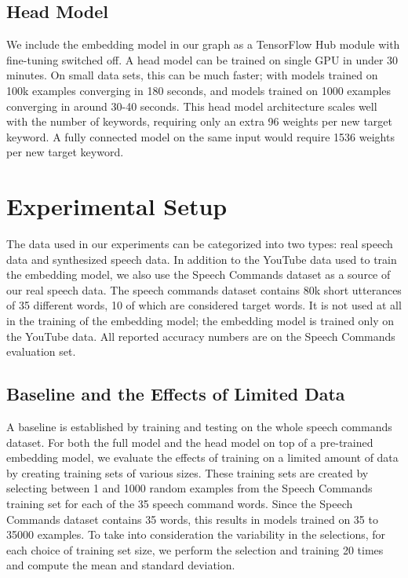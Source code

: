 \documentclass{article}
\begin{document}
\subsection{Head Model}
We include the embedding model in our graph as a TensorFlow Hub module with fine-tuning switched off. A head model can be trained on single GPU in under 30 minutes. On small data sets, this can be much faster; with models trained on 100k examples converging in 180 seconds, and models trained on 1000 examples converging in around 30-40 seconds. This head model architecture scales well with the number of keywords, requiring only an extra 96 weights per new target keyword. A fully connected model on the same input would require 1536 weights per new target keyword.







\section{Experimental Setup}
\label{sec:experiment_setup}
The data used in our experiments can be categorized into two types: real speech data and synthesized speech data. In addition to the YouTube data used to train the embedding model, we also use the Speech Commands dataset \cite{warden2018speech} as a source of our real speech data. The speech commands dataset contains 80k short utterances of 35 different words, 10 of which are considered target words. It is not used at all in the training of the embedding model; the embedding model is trained only on the YouTube data. All reported accuracy numbers are on the Speech Commands evaluation set.



\subsection{Baseline and the Effects of Limited Data}
A baseline is established by training and testing on the whole speech commands dataset.
For both the full model and the head model on top of a pre-trained embedding model, we evaluate the effects of training on a limited amount of data by creating training sets of various sizes. These training sets are created by selecting between 1 and 1000 random examples from the Speech Commands training set for each of the 35 speech command words. Since the Speech Commands dataset contains 35 words, this results in models trained  on 35 to 35000 examples. To take into consideration the variability in the selections, for each choice of training set size, we perform the selection and training 20 times and compute the mean and standard deviation.
\end{document}
